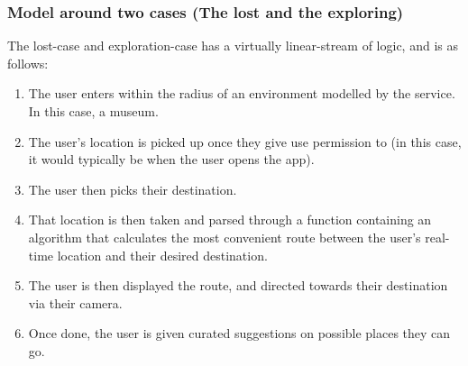 \documentclass{article}
\begin{document}
\subsubsection*{Model around two cases (The lost and the exploring) }
The lost-case and exploration-case has a virtually linear-stream of logic, and is as follows:
\begin{enumerate}
    \item The user enters within the radius of an environment modelled by the service. In this case, a museum.
    \item The user’s location is picked up once they give use permission to (in this case, it would typically be when the user opens the app). 
    \item The user then picks their destination.
    \item That location is then taken and parsed through a function containing an algorithm that calculates the most convenient route between the user’s real-time location and their desired destination.
    \item The user is then displayed the route, and directed towards their destination via their camera.
    \item Once done, the user is given curated suggestions on possible places they can go.
\end{enumerate}
\end{document}
